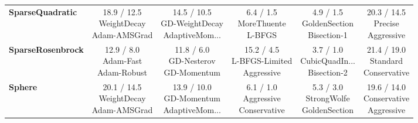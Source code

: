 \begin{longtable}{lccccc}
\textbf{SparseQuadratic} &  \makecell{18.9 / 12.5 \\ \scriptsize{WeightDecay} \\ \scriptsize{Adam-AMSGrad}}&  \makecell{14.5 / 10.5 \\ \scriptsize{GD-WeightDecay} \\ \scriptsize{AdaptiveMom...}}&  \makecell{6.4 / 1.5 \\ \scriptsize{MoreThuente} \\ \scriptsize{L-BFGS}}& \cellcolor{bestgreen!30} \makecell{4.9 / 1.5 \\ \scriptsize{GoldenSection} \\ \scriptsize{Bisection-1}}& \cellcolor{worstred!20} \makecell{20.3 / 14.5 \\ \scriptsize{Precise} \\ \scriptsize{Aggressive}} \\
\textbf{SparseRosenbrock} &  \makecell{12.9 / 8.0 \\ \scriptsize{Adam-Fast} \\ \scriptsize{Adam-Robust}}&  \makecell{11.8 / 6.0 \\ \scriptsize{GD-Nesterov} \\ \scriptsize{GD-Momentum}}&  \makecell{15.2 / 4.5 \\ \scriptsize{L-BFGS-Limited} \\ \scriptsize{Aggressive}}& \cellcolor{bestgreen!30} \makecell{3.7 / 1.0 \\ \scriptsize{CubicQuadIn...} \\ \scriptsize{Bisection-2}}& \cellcolor{worstred!20} \makecell{21.4 / 19.0 \\ \scriptsize{Standard} \\ \scriptsize{Conservative}} \\
\textbf{Sphere} & \cellcolor{worstred!20} \makecell{20.1 / 14.5 \\ \scriptsize{WeightDecay} \\ \scriptsize{Adam-AMSGrad}}&  \makecell{13.9 / 10.0 \\ \scriptsize{GD-Momentum} \\ \scriptsize{AdaptiveMom...}}&  \makecell{6.1 / 1.0 \\ \scriptsize{Aggressive} \\ \scriptsize{Conservative}}& \cellcolor{bestgreen!30} \makecell{5.3 / 3.0 \\ \scriptsize{StrongWolfe} \\ \scriptsize{GoldenSection}}&  \makecell{19.6 / 14.0 \\ \scriptsize{Conservative} \\ \scriptsize{Aggressive}} \\

\end{longtable}
